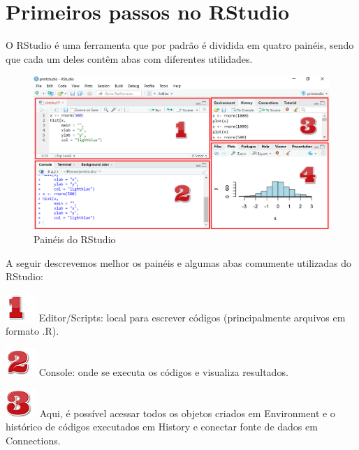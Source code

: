 \documentclass[
  letterpaper,
  DIV=11,
  numbers=noendperiod]{scrreprt}
\begin{document}
\hypertarget{primeiros-passos-no-rstudio}{%
\section{Primeiros passos no
RStudio}\label{primeiros-passos-no-rstudio}}

O RStudio é uma ferramenta que por padrão é dividida em quatro painéis,
sendo que cada um deles contêm abas com diferentes utilidades.

\begin{figure}

{\centering \includegraphics[width=1\textwidth,height=\textheight]{./figuras_tutorialR/rstudio1.png}

}

\caption{Painéis do RStudio}

\end{figure}

A seguir descrevemos melhor os painéis e algumas abas comumente
utilizadas do RStudio:

\includegraphics{./figuras_tutorialR/number1.png} Editor/Scripts: local
para escrever códigos (principalmente arquivos em formato .R).

\includegraphics{./figuras_tutorialR/number2.png} Console: onde se
executa os códigos e visualiza resultados.

\includegraphics{./figuras_tutorialR/number3.png} Aqui, é possível
acessar todos os objetos criados em Environment e o histórico de códigos
executados em History e conectar fonte de dados em Connections.
\end{document}
